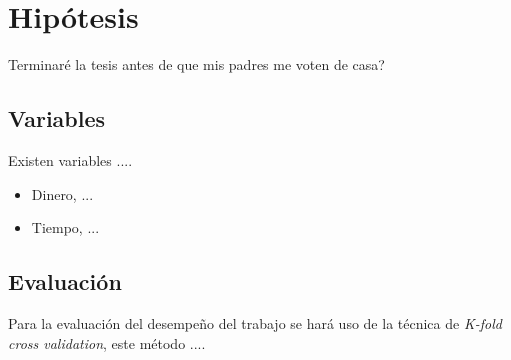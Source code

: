 \chapter{Hipótesis}
\label{chp:hipotesis}

Terminaré la tesis antes de que mis padres me voten de casa?

\section{Variables}
Existen variables ....
\begin{itemize}
\item Dinero, ...
\item Tiempo, ...
\end{itemize}

\section{Evaluación}

Para la evaluación del desempeño del trabajo se hará uso de la técnica de \emph{K-fold cross validation}, este método ....

